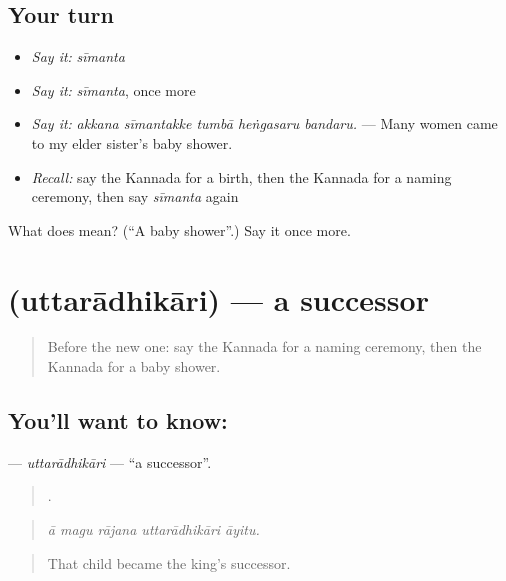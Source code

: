 \subsection*{Your turn}
\begin{itemize}
\raggedright
  \item \emph{Say it:} \emph{sīmanta}
  \item \emph{Say it:} \emph{sīmanta}, once more
  \item \emph{Say it:} \emph{akkana sīmantakke tumbā heṅgasaru bandaru.} — Many women came to my elder sister's baby shower.
  \item \emph{Recall:} say the Kannada for a birth, then the Kannada for a naming ceremony, then say \emph{sīmanta} again
\end{itemize}

\begin{tcolorbox}[breakable,colback=teal!4,colframe=teal!35!black,title={Before you move on}]
What does  mean? (\textquotedblleft{}A baby shower\textquotedblright{}.) Say it once more.
\end{tcolorbox}
\section[\texorpdfstring{\kn{ಉತ್ತರಾಧಿಕಾರಿ} (uttarādhikāri)}{ಉತ್ತರಾಧಿಕಾರಿ (uttarādhikāri)}]{ (uttarādhikāri) — a successor}

\label{lesson:KA-C334-uttaradhikari}



\begin{quote}
Before the new one: say the Kannada for a naming ceremony, then the Kannada for a baby shower.
\end{quote}

\subsection*{You'll want to know: }
\textbf{} — \emph{uttarādhikāri} — \textquotedblleft{}a successor\textquotedblright{}.

\begin{quote}
    .
\end{quote}

\begin{quote}
\emph{ā magu rājana uttarādhikāri āyitu.}
\end{quote}

\begin{quote}
That child became the king's successor.
\end{quote}

